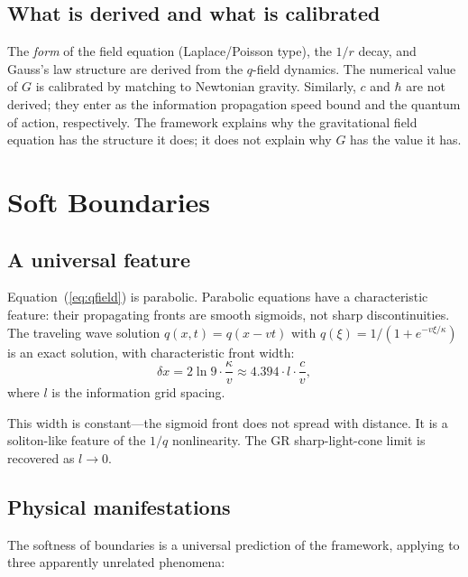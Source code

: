 \documentclass[12pt]{article}
\begin{document}
\subsection{What is derived and what is calibrated}

The \emph{form} of the field equation (Laplace/Poisson type), the $1/r$ decay, and Gauss's law structure are derived from the $q$-field dynamics. The numerical value of $G$ is calibrated by matching to Newtonian gravity. Similarly, $c$ and $\hbar$ are not derived; they enter as the information propagation speed bound and the quantum of action, respectively. The framework explains why the gravitational field equation has the structure it does; it does not explain why $G$ has the value it has.

\section{Soft Boundaries}

\subsection{A universal feature}

Equation~(\ref{eq:qfield}) is parabolic. Parabolic equations have a characteristic feature: their propagating fronts are smooth sigmoids, not sharp discontinuities. The traveling wave solution $q(x,t)=q(x-vt)$ with $q(\xi)=1/(1+e^{-v\xi/\kappa})$ is an exact solution, with characteristic front width:
\begin{equation}
\delta x = 2\ln 9 \cdot \frac{\kappa}{v} \approx 4.394 \cdot l \cdot \frac{c}{v},
\end{equation}
where $l$ is the information grid spacing.

This width is constant---the sigmoid front does not spread with distance. It is a soliton-like feature of the $1/q$ nonlinearity. The GR sharp-light-cone limit is recovered as $l\to 0$.

\subsection{Physical manifestations}

The softness of boundaries is a universal prediction of the framework, applying to three apparently unrelated phenomena:
\end{document}
